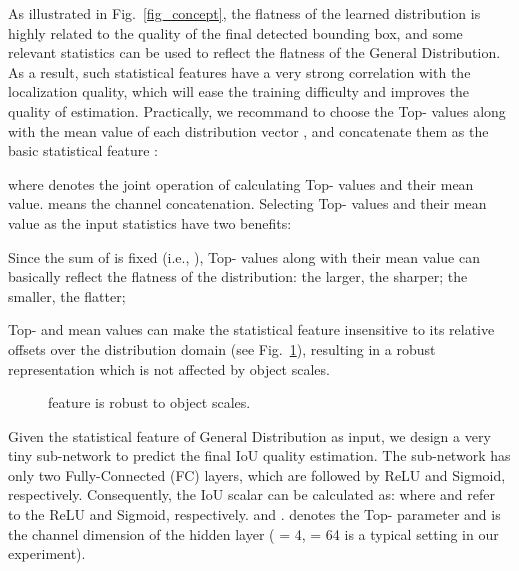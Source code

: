 \documentclass[10pt,twocolumn,letterpaper]{article}
\begin{document}
As illustrated in Fig.~\ref{fig_concept}, the flatness of the learned distribution is highly related to the quality of the final detected bounding box, and 
some relevant statistics can be used to reflect the flatness of the General Distribution.
As a result, such statistical features have a very strong correlation with the localization quality, which will ease the training difficulty and improves the quality of estimation. 
Practically, we recommand to choose the Top- values along with the mean value 
of each distribution vector , and concatenate them as the basic statistical feature :

where  denotes the joint operation of calculating Top- values and their mean value.  means the channel concatenation. Selecting Top- values and their mean value as the input statistics have two benefits: 


 Since the sum of  is fixed (i.e., ), Top- values along with their mean value can basically reflect the flatness of the distribution: the larger, the sharper; the smaller, the flatter;

 Top- and mean values can make the statistical feature insensitive to its relative offsets over the distribution domain (see Fig.~\ref{fig_topk_cropped}), resulting in a robust representation which is not affected by object scales.

\begin{figure}[h]
	\vspace{-10pt}
	\begin{center}
		\setlength{\fboxrule}{0pt}
	\end{center}	
	\vspace{-20pt}
	\caption{ feature is robust to object scales.}
	\label{fig_topk_cropped}
	\vspace{-10pt}
\end{figure}


Given the statistical feature  of General Distribution as input, we design a very tiny sub-network  to predict the final IoU quality estimation. 
The sub-network has only two Fully-Connected (FC) layers, which are followed by ReLU \cite{krizhevsky2012imagenet} and Sigmoid, respectively. Consequently, the IoU scalar  can be calculated as:
where  and  refer to the ReLU and Sigmoid, respectively.  and .  denotes the Top- parameter and  is the channel dimension of the hidden layer ( = 4,  = 64 is a typical setting in our experiment).
\end{document}
